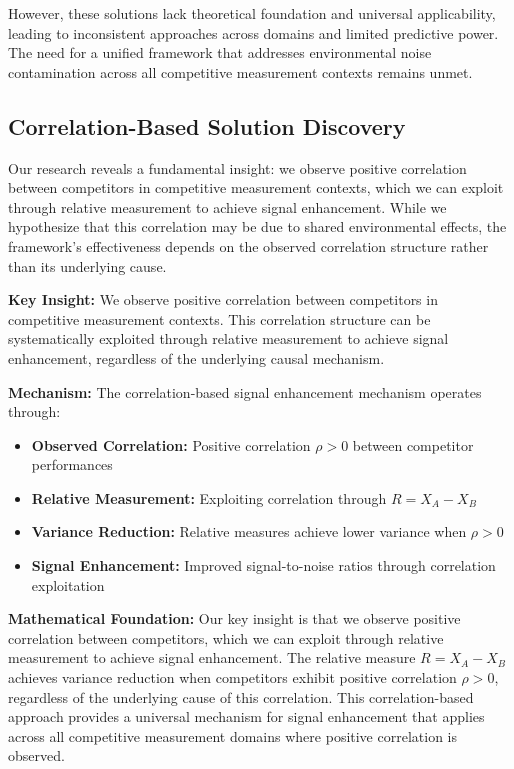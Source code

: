 However, these solutions lack theoretical foundation and universal applicability, leading to inconsistent approaches across domains and limited predictive power. The need for a unified framework that addresses environmental noise contamination across all competitive measurement contexts remains unmet.

\subsection{Correlation-Based Solution Discovery}

Our research reveals a fundamental insight: we observe positive correlation between competitors in competitive measurement contexts, which we can exploit through relative measurement to achieve signal enhancement. While we hypothesize that this correlation may be due to shared environmental effects, the framework's effectiveness depends on the observed correlation structure rather than its underlying cause.

\textbf{Key Insight:}
We observe positive correlation between competitors in competitive measurement contexts. This correlation structure can be systematically exploited through relative measurement to achieve signal enhancement, regardless of the underlying causal mechanism.

\textbf{Mechanism:}
The correlation-based signal enhancement mechanism operates through:
\begin{itemize}
    \item \textbf{Observed Correlation:} Positive correlation $\rho > 0$ between competitor performances
    \item \textbf{Relative Measurement:} Exploiting correlation through $R = X_A - X_B$
    \item \textbf{Variance Reduction:} Relative measures achieve lower variance when $\rho > 0$
    \item \textbf{Signal Enhancement:} Improved signal-to-noise ratios through correlation exploitation
\end{itemize}

\textbf{Mathematical Foundation:}
Our key insight is that we observe positive correlation between competitors, which we can exploit through relative measurement to achieve signal enhancement. The relative measure $R = X_A - X_B$ achieves variance reduction when competitors exhibit positive correlation $\rho > 0$, regardless of the underlying cause of this correlation. This correlation-based approach provides a universal mechanism for signal enhancement that applies across all competitive measurement domains where positive correlation is observed.

